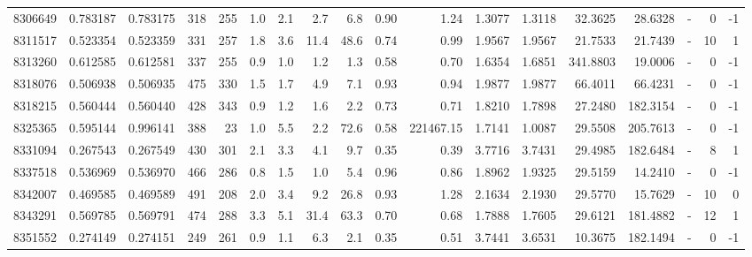 \begin{tabular}{rrrrrrrrrrrrrrrlrr}
   8306649 & 0.783187 &   0.783175 &  318 &  255 &      1.0 &      2.1 &     2.7 &      6.8 &       0.90 &        1.24 &  1.3077 &  1.3118 &   32.3625 &   28.6328 &             - &        0 &         -1 \\
   8311517 & 0.523354 &   0.523359 &  331 &  257 &      1.8 &      3.6 &    11.4 &     48.6 &       0.74 &        0.99 &  1.9567 &  1.9567 &   21.7533 &   21.7439 &             - &       10 &          1 \\
   8313260 & 0.612585 &   0.612581 &  337 &  255 &      0.9 &      1.0 &     1.2 &      1.3 &       0.58 &        0.70 &  1.6354 &  1.6851 &  341.8803 &   19.0006 &             - &        0 &         -1 \\
   8318076 & 0.506938 &   0.506935 &  475 &  330 &      1.5 &      1.7 &     4.9 &      7.1 &       0.93 &        0.94 &  1.9877 &  1.9877 &   66.4011 &   66.4231 &             - &        0 &         -1 \\
   8318215 & 0.560444 &   0.560440 &  428 &  343 &      0.9 &      1.2 &     1.6 &      2.2 &       0.73 &        0.71 &  1.8210 &  1.7898 &   27.2480 &  182.3154 &             - &        0 &         -1 \\
   8325365 & 0.595144 &   0.996141 &  388 &   23 &      1.0 &      5.5 &     2.2 &     72.6 &       0.58 &   221467.15 &  1.7141 &  1.0087 &   29.5508 &  205.7613 &             - &        0 &         -1 \\
   8331094 & 0.267543 &   0.267549 &  430 &  301 &      2.1 &      3.3 &     4.1 &      9.7 &       0.35 &        0.39 &  3.7716 &  3.7431 &   29.4985 &  182.6484 &             - &        8 &          1 \\
   8337518 & 0.536969 &   0.536970 &  466 &  286 &      0.8 &      1.5 &     1.0 &      5.4 &       0.96 &        0.86 &  1.8962 &  1.9325 &   29.5159 &   14.2410 &             - &        0 &         -1 \\
   8342007 & 0.469585 &   0.469589 &  491 &  208 &      2.0 &      3.4 &     9.2 &     26.8 &       0.93 &        1.28 &  2.1634 &  2.1930 &   29.5770 &   15.7629 &             - &       10 &          0 \\
   8343291 & 0.569785 &   0.569791 &  474 &  288 &      3.3 &      5.1 &    31.4 &     63.3 &       0.70 &        0.68 &  1.7888 &  1.7605 &   29.6121 &  181.4882 &             - &       12 &          1 \\
   8351552 & 0.274149 &   0.274151 &  249 &  261 &      0.9 &      1.1 &     6.3 &      2.1 &       0.35 &        0.51 &  3.7441 &  3.6531 &   10.3675 &  182.1494 &             - &        0 &         -1 \\

\end{tabular}
